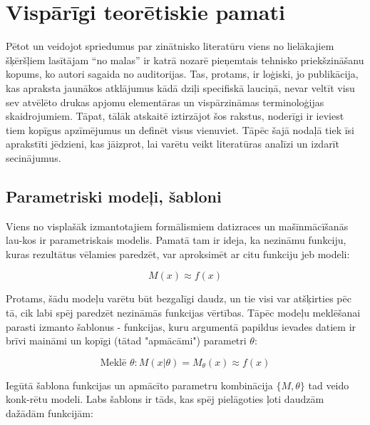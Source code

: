 \documentclass[12pt, a4paper]{article}
\numberwithin{equation}{section} %
\begin{document}
%
%
%
%
%
%
%
%
%
%
%
%
%
%
%
%
%
%
%

\newpage
\section{Vispārīgi teorētiskie pamati}

Pētot un veidojot spriedumus par zinātnisko literatūru viens no lielākajiem šķēršļiem lasītājam ``no malas'' ir katrā nozarē pieņemtais tehnisko priekšzināšanu kopums, ko autori sagaida no auditorijas. Tas, protams, ir loģiski, jo publikācija, kas apraksta jaunākos atklājumus kādā dziļi specifiskā lauciņā, nevar veltīt visu sev atvēlēto drukas apjomu elementāras un vispārzināmas terminoloģijas skaidrojumiem. Tāpat, tālāk atskaitē iztirzājot šos rakstus, noderīgi ir ieviest tiem kopīgus apzīmējumus un definēt visus vienuviet. Tāpēc šajā nodaļā tiek īsi aprakstīti jēdzieni, kas jāizprot, lai varētu veikt literatūras analīzi un izdarīt secinājumus.

\subsection{Parametriski modeļi, šabloni}

Viens no visplašāk izmantotajiem formālismiem datizraces un mašīnmācīšanās lau-kos ir parametriskais modelis. Pamatā tam ir ideja, ka nezināmu funkciju, kuras rezultātus vēlamies paredzēt, var aproksimēt ar citu funkciju jeb modeli:

\begin{equation} 
    M(x) \approx f(x)
\end{equation}

Protams, šādu modeļu varētu būt bezgalīgi daudz, un tie visi var atšķirties pēc tā, cik labi spēj paredzēt nezināmās funkcijas vērtības. Tāpēc modeļu meklēšanai parasti izmanto šablonus - funkcijas, kuru argumentā papildus ievades datiem ir brīvi maināmi un kopīgi (tātad "apmācāmi") parametri $\theta$:

\begin{equation} 
    \text{Meklē } \theta:M(x \vert \theta) = M_{\theta}(x)  \approx f(x)
\end{equation}

Iegūtā šablona funkcijas un apmācīto parametru kombinācija $\lbrace M, \theta \rbrace$ tad veido konk-rētu modeli. Labs šablons ir tāds, kas spēj pielāgoties ļoti daudzām dažādām funkcijām:
\end{document}
